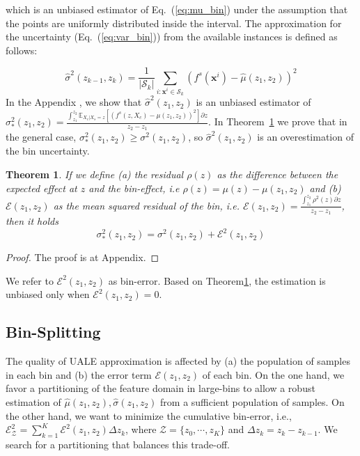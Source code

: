 \documentclass[twoside]{article}
\newtheorem{theorem}{Theorem}[section]
\newcommand{\dfdx}{f^s}
\begin{document}
%
which is an unbiased estimator of Eq.~(\ref{eq:mu_bin}) under the
assumption that the points are uniformly distributed inside the
interval. The approximation for the uncertainty
(Eq.~(\ref{eq:var_bin})) from the available instances is defined as
follows:

%
\begin{equation}
  \label{eq:var_bin_approx}
  \hat{\sigma}^2(z_{k-1}, z_k) = \frac{1}{|\mathcal{S}_k|}
\sum_{i:\mathbf{x}^i \in \mathcal{S}_k} \left ( \dfdx(\mathbf{x}^i) -
  \hat{\mu}(z_1, z_2) \right )^2
\end{equation}
%
In the Appendix %
, we show that
\(\hat{\sigma}^2(z_1, z_2)\) is an unbiased estimator of
\(\sigma^2_*(z_1, z_2) = \frac{\int_{z_1}^{z_2} \mathbb{E}_{X_c|X_s=z}
  \left [ (f^s(z, X_c) - \mu(z_1, z_2) )^2 \right] \partial z}{z_2 -
  z_1} \). In Theorem~\ref{sec:theorem-1} we prove that in the general
case, \(\sigma_*^2(z_1, z_2) \geq \sigma^2(z_1, z_2)\), so
\(\hat{\sigma}^2(z_1, z_2)\) is an overestimation of the bin
uncertainty.

\begin{theorem}
  \label{sec:theorem-1}
  If we define (a) the residual \(\rho(z)\) as the difference between
  the expected effect at \(z\) and the bin-effect, i.e
  \(\rho(z) = \mu(z) - \mu(z_1, z_2)\) and (b)
  \(\mathcal{E}(z_1, z_2)\) as the mean squared residual of the bin,
  i.e.
  \(\mathcal{E}(z_1, z_2) = \frac{\int_{z_1}^{z_2}\rho^2(z) \partial
    z}{z_2 - z_1}\), then it holds
\begin{equation}
    \label{eq:bin-uncertainty-proof}
 \sigma_*^2(z_1, z_2) = \sigma^2(z_1, z_2) + \mathcal{E}^2(z_1, z_2)
\end{equation}
  \end{theorem}

\begin{proof}
The proof is at Appendix.%
\end{proof}

\noindent

We refer to \(\mathcal{E}^2(z_1, z_2)\) as bin-error. Based on
Theorem\ref{sec:theorem-1}, the estimation is unbiased only when
\(\mathcal{E}^2(z_1, z_2) = 0\).

\subsection{Bin-Splitting}
\label{sec:bin-spliting}

The quality of UALE approximation is affected by (a) the population of
samples in each bin and (b) the error term \(\mathcal{E}(z_1, z_2)\)
of each bin. On the one hand, we favor a partitioning of the feature
domain in large-bins to allow a robust estimation of
\(\hat{\mu}(z_1, z_2), \hat{\sigma}(z_1, z_2)\) from a sufficient
population of samples. On the other hand, we want to minimize the
cumulative bin-error, i.e.,
\( \mathcal{E}^2_{\mathcal{Z}} = \sum_{k=1}^K\mathcal{E}^2(z_1, z_2)
\Delta z_k\), where \(\mathcal{Z} = \{z_0, \cdots, z_K\}\) and
\(\Delta z_k = z_k - z_{k-1}\). We search for a partitioning that
balances this trade-off.
\end{document}
